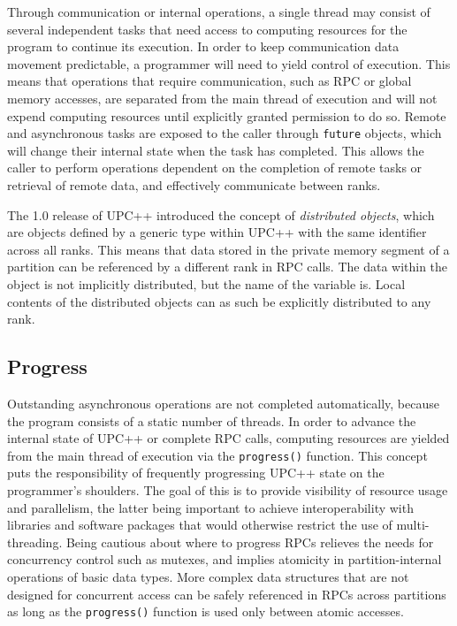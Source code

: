 \documentclass{uit-report}
\begin{document}
Through communication or internal operations, a single thread may consist of several independent tasks that need access to computing resources for the program to continue its execution. In order to keep communication data movement predictable, a programmer will need to yield control of execution. This means that operations that require communication, such as RPC or global memory accesses, are separated from the main thread of execution and will not expend computing resources until explicitly granted permission to do so. Remote and asynchronous tasks are exposed to the caller through \texttt{future} objects, which will change their internal state when the task has completed. This allows the caller to perform operations dependent on the completion of remote tasks or retrieval of remote data, and effectively communicate between ranks.

The 1.0 release of UPC++ introduced the concept of \emph{distributed objects}, which are objects defined by a generic type within UPC++ with the same identifier across all ranks. This means that data stored in the private memory segment of a partition can be referenced by a different rank in RPC calls. The data within the object is not implicitly distributed, but the name of the variable is. Local contents of the distributed objects can as such be explicitly distributed to any rank.

\subsection{Progress}
Outstanding asynchronous operations are not completed automatically, because the program consists of a static number of threads. In order to advance the internal state of UPC++ or complete RPC calls, computing resources are yielded from the main thread of execution via the \texttt{progress()} function. This concept puts the responsibility of frequently progressing UPC++ state on the programmer's shoulders. The goal of this is to provide visibility of resource usage and parallelism, the latter being important to achieve interoperability with libraries and software packages that would otherwise restrict the use of multi-threading. Being cautious about where to progress RPCs relieves the needs for concurrency control such as mutexes, and implies atomicity in partition-internal operations of basic data types. More complex data structures that are not designed for concurrent access can be safely referenced in RPCs across partitions as long as the \texttt{progress()} function is used only between atomic accesses.
\end{document}
